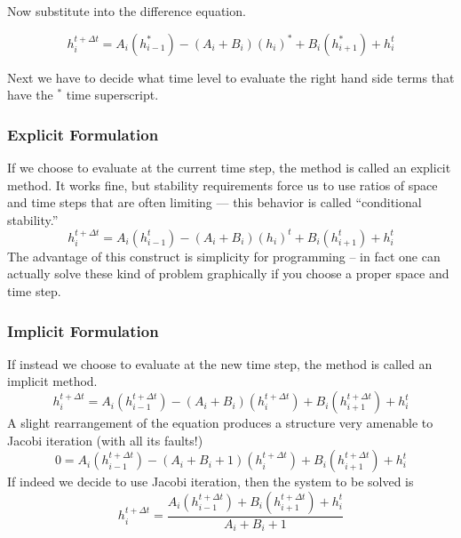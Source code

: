 Now substitute into the difference equation.

\begin{equation}
h_{i}^{t + \Delta t} = A_{i}(h_{i-1}^{*}) -(A_{i}+B_{i})(h_{i})^{*}+ B_{i}(h_{i+1}^{*}) + h_{i}^t
\end{equation}

Next we have to decide what time level to evaluate the right hand side terms that have the $^{*}$ time superscript.
\subsubsection{Explicit Formulation}
If we choose to evaluate at the current time step, the method is called an explicit method.  
It works fine, but stability requirements force us to use ratios of space and time steps that are often limiting --- this behavior is called ``conditional stability.'' 
\begin{equation}
h_{i}^{t + \Delta t} = A_{i}(h_{i-1}^{t}) -(A_{i}+B_{i})(h_{i})^{t}+ B_{i}(h_{i+1}^{t}) + h_{i}^t
\end{equation}
The advantage of this construct is simplicity for programming -- in fact one can actually solve these kind of problem graphically if you choose a proper space and time step.

\subsubsection{Implicit Formulation}
If instead we choose to evaluate at the new time step, the method is called an implicit method. 
\begin{equation}
h_{i}^{t + \Delta t} = A_{i}(h_{i-1}^{t + \Delta t}) -(A_{i}+B_{i})(h_{i}^{t + \Delta t})+ B_{i}(h_{i+1}^{t + \Delta t}) + h_{i}^t
\end{equation}
A slight rearrangement of the equation produces a structure very amenable to Jacobi iteration (with all its faults!)
\begin{equation}
0= A_{i}(h_{i-1}^{t + \Delta t}) -(A_{i}+B_{i}+1)(h_{i}^{t + \Delta t})+ B_{i}(h_{i+1}^{t + \Delta t}) + h_{i}^t
\end{equation}
If indeed we decide to use Jacobi iteration, then the system to be solved is
\begin{equation}
h_{i}^{t + \Delta t} = \frac{A_{i}(h_{i-1}^{t + \Delta t}) + B_{i}(h_{i+1}^{t + \Delta t}) + h_{i}^t}{A_{i}+B_{i}+1}
\end{equation}

